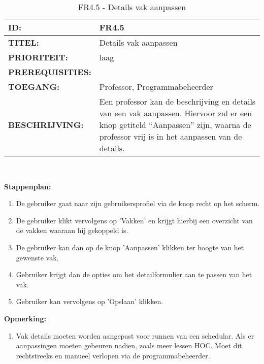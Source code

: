         
\noindent\begin{table}[H]
            \begin{tabular}{l | p{10cm}}
                \textbf{ID:} & FR4.5 \\ \hline
                \textbf{TITEL:} & Details vak aanpassen\\ \hline
                \textbf{PRIORITEIT:} &  laag \\ \hline
                \textbf{PREREQUISITIES:} & \\ \hline
                \textbf{TOEGANG:} & Professor, Programmabeheerder \\ \hline
                \textbf{BESCHRIJVING:} & Een professor kan de beschrijving en details van een vak aanpassen. Hiervoor zal er een knop getiteld “Aanpassen” zijn, waarna de professor vrij is in het aanpassen van de details. \\ 
            \end{tabular}\\
            \caption{FR4.5 - Details vak aanpassen}
            \label{tab:FR4.5 - Details vak aanpassen}
        \end{table}	
        
\textbf{Stappenplan:}
	\begin{enumerate}
	\item De gebruiker gaat naar zijn gebruikersprofiel via de knop recht op het scherm.
	\item De gebruiker klikt vervolgens op 'Vakken' en krijgt hierbij een overzicht van de vakken waaraan hij gekoppeld is.
	\item De gebruiker kan dan op de knop 'Aanpassen' klikken ter hoogte van het gewenste vak.
	\item Gebruiker krijgt dan de opties om het detailformulier aan te passen van het vak.
	\item Gebruiker kan vervolgens op 'Opslaan' klikken.
	\end{enumerate}

\textbf{Opmerking:}
	\begin{enumerate}
	\item Vak details moeten worden aangepast voor runnen van een schedular. Als er aanpassingen moeten gebeuren nadien, zoals meer lessen HOC. Moet dit rechtstreeks en manueel verlopen via de programmabeheerder.
	\end{enumerate}
        
